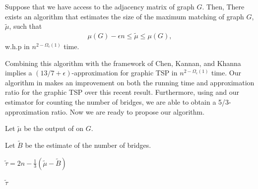 \begin{proposition}\label{prop:matching-estimator}
    Suppose that we have access to the adjacency matrix of graph $G$. Then, There exists an algorithm that estimates the size of the maximum matching of graph $G$, $\tilde \mu$, such that
    \begin{align*}
        \mu(G) - \epsilon n \leq \tilde \mu \leq \mu(G),
    \end{align*}
    w.h.p in $n^{2-\Omega_\epsilon(1)}$ time.
\end{proposition}

Combining this algorithm with the framework of Chen, Kannan, and Khanna \cite{chen2020} implies a $(13/7+\epsilon)$-approximation for graphic TSP in $n^{2-\Omega_\epsilon(1)}$ time. Our algorithm in  makes an improvement on both the running time and approximation ratio for the graphic TSP over this recent result. Furthermore, using  and our estimator for counting the number of bridges, we are able to obtain a 5/3-approximation ratio. Now we are ready to propose our algorithm.


\begin{algorithm}
\caption{Slightly subquadratic algorithm for graphic TSP.}
\label{alg: graphic-tsp3}
    
    Let $\tilde{\mu}$ be the output of  on $G$.
    
    Let $\tilde{B}$ be the estimate of the number of bridges. 
    
    $\tilde{\tau} = 2n - \frac{1}{3}(\tilde{\mu} - \tilde{B})$
    
    \Return $\tilde{\tau}$
\end{algorithm}

